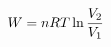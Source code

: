 \documentclass[preview]{standalone}
\begin{document}
\begin{align*}
\special{dvisvgm:raw <g id='unique000'>}W = nRT \ln\frac{V_2}{V_1}\special{dvisvgm:raw </g>}
\end{align*}
\end{document}
